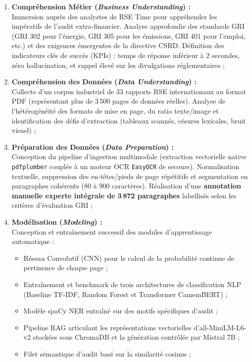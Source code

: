 \documentclass[12pt,a4paper]{report}
\begin{document}
\begin{enumerate}[label=\textbf{Phase \arabic* :}, wide=0pt]
    \item \textbf{Compréhension Métier (\textit{Business Understanding}) :}\\
    Immersion auprès des analystes de RSE Time pour appréhender les impératifs de l'audit extra-financier. Analyse approfondie des standards GRI (GRI 302 pour l'énergie, GRI 305 pour les émissions, GRI 401 pour l'emploi, etc.) et des exigences émergentes de la directive CSRD. Définition des indicateurs clés de succès (KPIs) : temps de réponse inférieur à 2 secondes, zéro hallucination, et rappel élevé sur les divulgations réglementaires ;
    
    \item \textbf{Compréhension des Données (\textit{Data Understanding}) :}\\
    Collecte d'un corpus industriel de 33 rapports RSE internationaux au format PDF (représentant plus de 3\,500 pages de données réelles). Analyse de l'hétérogénéité des formats de mise en page, du ratio texte/image et identification des défis d'extraction (tableaux scannés, césures lexicales, bruit visuel) ;
    
    \item \textbf{Préparation des Données (\textit{Data Preparation}) :}\\
    Conception du pipeline d'ingestion multimodale (extraction vectorielle native \texttt{pdfplumber} couplée à un moteur OCR \texttt{EasyOCR} de secours). Normalisation textuelle, suppression des en-têtes/pieds de page répétitifs et segmentation en paragraphes cohérents (80 à 900 caractères). Réalisation d'une \textbf{annotation manuelle experte intégrale de 3\,872 paragraphes} labellisés selon les critères d'évaluation GRI ;
    
    \item \textbf{Modélisation (\textit{Modeling}) :}\\
    Conception et entraînement successif des modules d'apprentissage automatique :
    \begin{itemize}
        \item Réseau Convolutif (CNN) pour le calcul de la probabilité continue de pertinence de chaque page ;
        \item Entraînement et benchmark de trois architectures de classification NLP (Baseline TF-IDF, Random Forest et Transformer CamemBERT) ;
        \item Modèle spaCy NER entraîné sur des motifs spécifiques d'audit ;
        \item Pipeline RAG articulant les représentations vectorielles d'all-MiniLM-L6-v2 stockées sous ChromaDB et la génération contrôlée par Mistral 7B ;
        \item Filet sémantique d'audit basé sur la similarité cosinus ;
    \end{itemize}
    

\end{enumerate}
\end{document}
